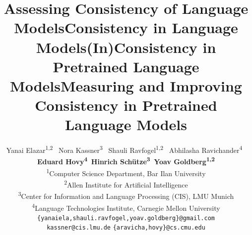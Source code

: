 \documentclass[11pt]{article}
\title{Assessing Consistency of Language Models}
\title{Consistency in Language Models}
\title{(In)Consistency in Pretrained Language Models}
\title{Measuring and Improving Consistency in Pretrained Language Models}
\author{Yanai Elazar\textsuperscript{1,2} \,
 Nora Kassner\textsuperscript{3} \,
 Shauli Ravfogel\textsuperscript{1,2} \, 
 Abhilasha Ravichander\textsuperscript{4} \, \\
 {\bf Eduard Hovy\textsuperscript{4}\, 
 \bf Hinrich Sch\"utze\textsuperscript{3}\, 
 Yoav Goldberg\textsuperscript{1,2}}\\
\textsuperscript{1}Computer Science Department, Bar Ilan University \\
\textsuperscript{2}Allen Institute for Artificial Intelligence \\
\textsuperscript{3}Center for Information and Language Processing (CIS), LMU Munich\\
\textsuperscript{4}Language Technologies Institute, Carnegie Mellon University \\
  {\tt  \{yanaiela,shauli.ravfogel,yoav.goldberg\}@gmail.com}\\
  {\tt kassner@cis.lmu.de} 
  {\tt \{aravicha,hovy\}@cs.cmu.edu} 
  }
\begin{document}
\maketitle
\begin{abstract}

\end{abstract}


% 












% 









% 

% 










\end{document}
